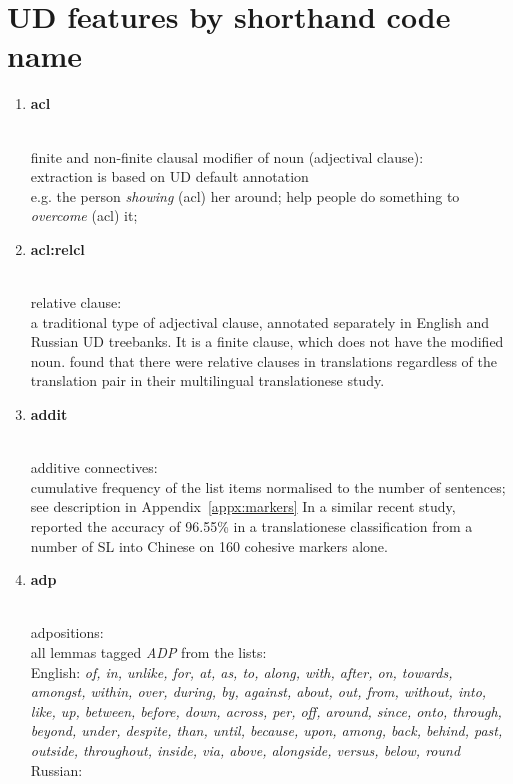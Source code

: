 \chapter{\label{appx:ud}UD features by shorthand code name}

\begin{enumerate}
	\item \hypertarget{ft:acl}{\textbf{acl}} \\
			finite and non-finite clausal modifier of noun (adjectival clause): \\
			extraction is based on UD default annotation \\
			e.g. the person \textit{showing} (acl) her around; help people do something to \textit{overcome} (acl) it; 
			
	\item \hypertarget{ft:acl:relcl}{\textbf{acl:relcl}} \\
		relative clause: \\
		a traditional type of adjectival clause, annotated separately in English and Russian UD treebanks. It is a finite clause, which does not have the modified noun.
		\citet{Hu2021} found that there were relative clauses in translations regardless of the translation pair in their multilingual translationese study.
	
	\item \hypertarget{ft:addit}{\textbf{addit}} \\
		additive connectives: \\
		cumulative frequency of the list items normalised to the number of sentences; see description in Appendix~\ref{appx:markers}
		In a similar recent study,~\cite{Hu2021} reported the accuracy of 96.55\% in a translationese classification from a number of SL into Chinese on 160 cohesive markers alone.
	
	\item \hypertarget{ft:adp}{\textbf{adp}} \\
		adpositions: \\
		all lemmas tagged \textit{ADP} from the lists: \\
		English: \textit{of, in, unlike, for, at, as, to, along, with, after, on, towards, amongst, within, over, during, by, against, about, out, from, without, into, like, up, between, before, down, across, per, off, around, since, onto, through, beyond, under, despite, than, until, because, upon, among, back, behind, past, outside, throughout, inside, via, above, alongside, versus, below, round} \\
		Russian: 
		

\end{enumerate}
